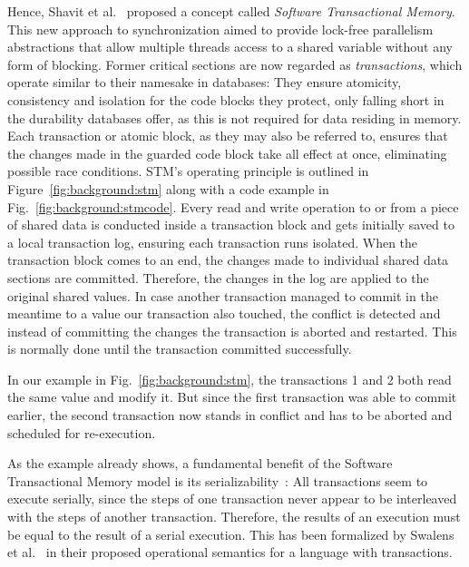 Hence, Shavit et al.~\cite{shavit1997software} proposed a concept called \emph{Software Transactional Memory}.
This new approach to synchronization aimed to provide lock-free parallelism abstractions that allow multiple threads access to a shared variable without any form of blocking.
Former critical sections are now regarded as \emph{transactions}, which operate similar to their namesake in databases: 
They ensure atomicity, consistency and isolation for the code blocks they protect, only falling short in the durability databases offer, as this is not required for data residing in memory.
Each transaction or atomic block, as they may also be referred to, ensures that the changes made in the guarded code block take all effect at once, eliminating possible race conditions.
STM's operating principle is outlined in Figure~\ref{fig:background:stm} along with a code example in Fig.~\ref{fig:background:stmcode}.
Every read and write operation to or from a piece of shared data is conducted inside a transaction block and gets initially saved to a local transaction log, ensuring each transaction runs isolated.
When the transaction block comes to an end, the changes made to individual shared data sections are committed.
Therefore, the changes in the log are applied to the original shared values.
In case another transaction managed to commit in the meantime to a value our transaction also touched, the conflict is detected and instead of committing the changes the transaction is aborted and restarted.
This is normally done until the transaction committed successfully.

In our example in Fig.~\ref{fig:background:stm}, the transactions 1 and 2 both read the same value and modify it.
But since the first transaction was able to commit earlier, the second transaction now stands in conflict and has to be aborted and scheduled for re-execution.

As the example already shows, a fundamental benefit of the Software Transactional Memory model is its serializability~\cite{swalens2016transactional}:
All transactions seem to execute serially, since the steps of one transaction never appear to be interleaved with the steps of another transaction.
Therefore, the results of an execution must be equal to the result of a serial execution.
This has been formalized by Swalens et al.~\cite{swalens2016transactional} in their proposed operational semantics for a language with transactions.

